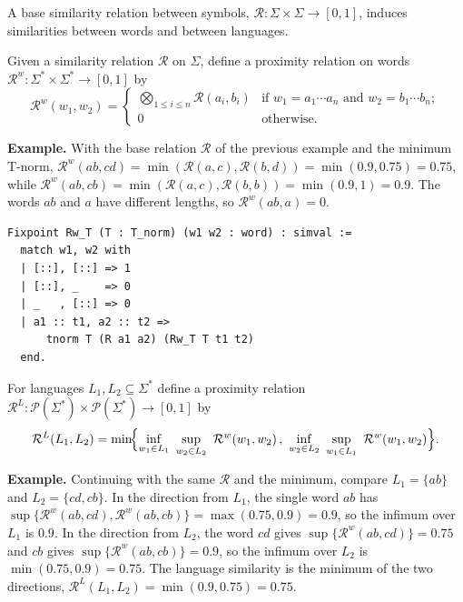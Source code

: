 A base similarity relation between symbols,
$\mathcal{R}:\Sigma\times\Sigma\to[0,1]$, induces similarities between words and
between languages.

\begin{definition}\label{def:Rw}
Given a similarity relation $\mathcal{R}$ on $\Sigma$, define a proximity relation
on words $\mathcal{R}^{w}:\Sigma^{*}\times\Sigma^{*}\to[0,1]$ by
\[
\mathcal{R}^{w}(w_1,w_2)=
\begin{cases}
\bigotimes_{1\le i\le n}\mathcal{R}(a_i,b_i)
  & \text{if } w_1=a_1\cdots a_n \text{ and } w_2=b_1\cdots b_n;\\[0.4ex]
0 & \text{otherwise.}
\end{cases}
\]
\end{definition}

\noindent\textbf{Example.} With the base relation $\mathcal{R}$ of the previous
example and the minimum T-norm,
$\mathcal{R}^{w}(ab,cd)=\min(\mathcal{R}(a,c),\mathcal{R}(b,d))=\min(0.9,0.75)=0.75$,
while $\mathcal{R}^{w}(ab,cb)=\min(\mathcal{R}(a,c),\mathcal{R}(b,b))=\min(0.9,1)=0.9$.
The words $ab$ and $a$ have different lengths, so $\mathcal{R}^{w}(ab,a)=0$.

\begin{lstlisting}[style=rocqstyle,caption={Similarity on words (\texttt{SimilarityRelations.v}).},label={lst:Rw}]
Fixpoint Rw_T (T : T_norm) (w1 w2 : word) : simval :=
  match w1, w2 with
  | [::], [::] => 1
  | [::], _    => 0
  | _   , [::] => 0
  | a1 :: t1, a2 :: t2 =>
      tnorm T (R a1 a2) (Rw_T T t1 t2)
  end.
\end{lstlisting}

\begin{definition}\label{def:RL}
For languages $L_1,L_2\subseteq\Sigma^{*}$ define a proximity relation
$\mathcal{R}^{L}:\mathcal{P}(\Sigma^{*})\times\mathcal{P}(\Sigma^{*})\to[0,1]$ by
\[
\mathcal{R}^{L}(L_1,L_2)=
\min\!\Bigl\{
\inf_{w_1\in L_1}\ \sup_{w_2\in L_2}\ \mathcal{R}^{w}(w_1,w_2)\,,\
\inf_{w_2\in L_2}\ \sup_{w_1\in L_1}\ \mathcal{R}^{w}(w_1,w_2)
\Bigr\}.
\]
\end{definition}

\noindent\textbf{Example.} Continuing with the same $\mathcal{R}$ and the minimum,
compare $L_1=\{ab\}$ and $L_2=\{cd,cb\}$. In the direction from $L_1$, the single
word $ab$ has $\sup\{\mathcal{R}^{w}(ab,cd),\mathcal{R}^{w}(ab,cb)\}=\max(0.75,0.9)=0.9$,
so the infimum over $L_1$ is $0.9$. In the direction from $L_2$, the word $cd$ gives
$\sup\{\mathcal{R}^{w}(ab,cd)\}=0.75$ and $cb$ gives
$\sup\{\mathcal{R}^{w}(ab,cb)\}=0.9$, so the infimum over $L_2$ is
$\min(0.75,0.9)=0.75$. The language similarity is the minimum of the two directions,
$\mathcal{R}^{L}(L_1,L_2)=\min(0.9,0.75)=0.75$.

